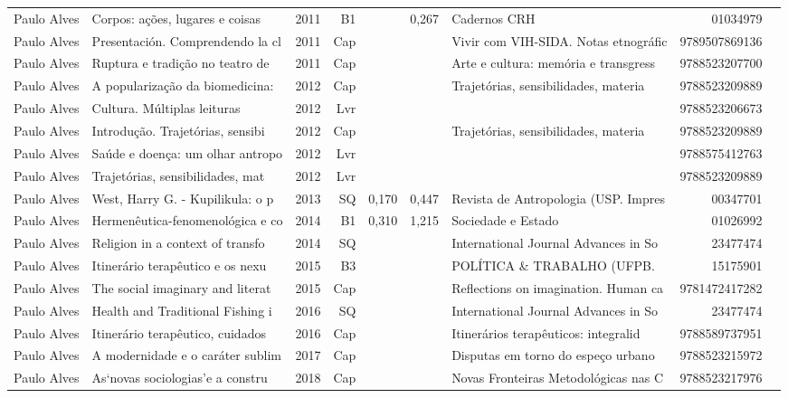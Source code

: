 \documentclass[12pt,brazil]{article}\usepackage[]{graphicx}\usepackage[]{xcolor}
\begin{document}
\begin{longtable}{lllrrllrr}
\rowcolor{coautr}Paulo Alves & Corpos: ações, lugares e coisas  & 2011 & B1 &  & 0,267 & Cadernos CRH & 01034979 \\
Paulo Alves & Presentación. Comprendendo la cl & 2011 & Cap &  &  & Vivir com VIH-SIDA. Notas etnográfic & 9789507869136 \\
Paulo Alves & Ruptura e tradição no teatro de  & 2011 & Cap &  &  & Arte e cultura: memória e transgress & 9788523207700 \\
\rowcolor{capdup}Paulo Alves & A popularização da biomedicina:  & 2012 & Cap &  &  & Trajetórias, sensibilidades, materia & 9788523209889 \\
\rowcolor{duplic}Paulo Alves & Cultura. Múltiplas leituras & 2012 & Lvr &  &  &  & 9788523206673 \\
\rowcolor{capdup}Paulo Alves & Introdução. Trajetórias, sensibi & 2012 & Cap &  &  & Trajetórias, sensibilidades, materia & 9788523209889 \\
Paulo Alves & Saúde e doença: um olhar antropo & 2012 & Lvr &  &  &  & 9788575412763 \\
Paulo Alves & Trajetórias, sensibilidades, mat & 2012 & Lvr &  &  &  & 9788523209889 \\
Paulo Alves & West, Harry G. - Kupilikula: o p & 2013 & SQ & 0,170 & 0,447 & Revista de Antropologia (USP. Impres & 00347701 \\
\rowcolor{coautr}Paulo Alves & Hermenêutica-fenomenológica e co & 2014 & B1 & 0,310 & 1,215 & Sociedade e Estado & 01026992 \\
Paulo Alves & Religion in a context of transfo & 2014 & SQ &  &  & International Journal Advances in So & 23477474 \\
Paulo Alves & Itinerário terapêutico e os nexu & 2015 & B3 &  &  & POLÍTICA \& TRABALHO (UFPB. & 15175901 \\
Paulo Alves & The social imaginary and literat & 2015 & Cap &  &  & Reflections on imagination. Human ca & 9781472417282 \\
\rowcolor{coautr}Paulo Alves & Health and Traditional Fishing i & 2016 & SQ &  &  & International Journal Advances in So & 23477474 \\
Paulo Alves & Itinerário terapêutico, cuidados & 2016 & Cap &  &  & Itinerários terapêuticos: integralid & 9788589737951 \\
Paulo Alves & A modernidade e o caráter sublim & 2017 & Cap &  &  & Disputas em torno do espeço urbano & 9788523215972 \\
\rowcolor{capdup}Paulo Alves & As‘novas sociologias’e a constru & 2018 & Cap &  &  & Novas Fronteiras Metodológicas nas C & 9788523217976 \\

\end{longtable}
\end{document}
